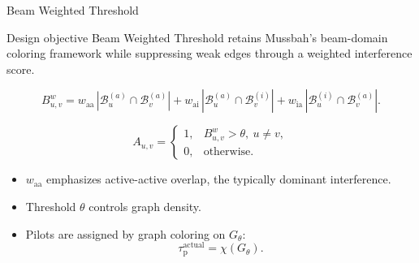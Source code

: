 \documentclass[10pt,aspectratio=169]{beamer}
\newcommand{\tauactual}{\tau_{\mathrm{p}}^{\mathrm{actual}}}
\newcommand{\BWT}{Beam Weighted Threshold}
\newcommand{\waa}{w_{\mathrm{aa}}}
\newcommand{\wai}{w_{\mathrm{ai}}}
\newcommand{\wia}{w_{\mathrm{ia}}}
\newenvironment{tightitemize}{%
    \begin{itemize}
        \setlength{\itemsep}{2pt}
        \setlength{\parskip}{0pt}
        \setlength{\parsep}{0pt}
}{%
    \end{itemize}
}
\begin{document}
\begin{frame}{Beam Weighted Threshold}
    \small
    \begin{block}{Design objective}
        \BWT{} retains Mussbah's beam-domain coloring framework while suppressing weak edges through a weighted interference score.
    \end{block}

    \vspace{0.4em}
    \[
        B_{u,v}^{w}
        =
        \waa\,|\mathcal{B}_{u}^{(a)}\cap\mathcal{B}_{v}^{(a)}|
        +
        \wai\,|\mathcal{B}_{u}^{(a)}\cap\mathcal{B}_{v}^{(i)}|
        +
        \wia\,|\mathcal{B}_{u}^{(i)}\cap\mathcal{B}_{v}^{(a)}|.
    \]

    \[
        A_{u,v}
        =
        \begin{cases}
            1, & B_{u,v}^{w}>\theta,\ u\neq v, \\
            0, & \text{otherwise.}
        \end{cases}
    \]

    \vspace{0.3em}
    \begin{tightitemize}
        \item \(\waa\) emphasizes active-active overlap, the typically dominant interference.
        \item Threshold \(\theta\) controls graph density.
        \item Pilots are assigned by graph coloring on \(G_{\theta}\):
        \[
            \tauactual = \chi(G_{\theta}).
        \]
    \end{tightitemize}
\end{frame}
\end{document}
